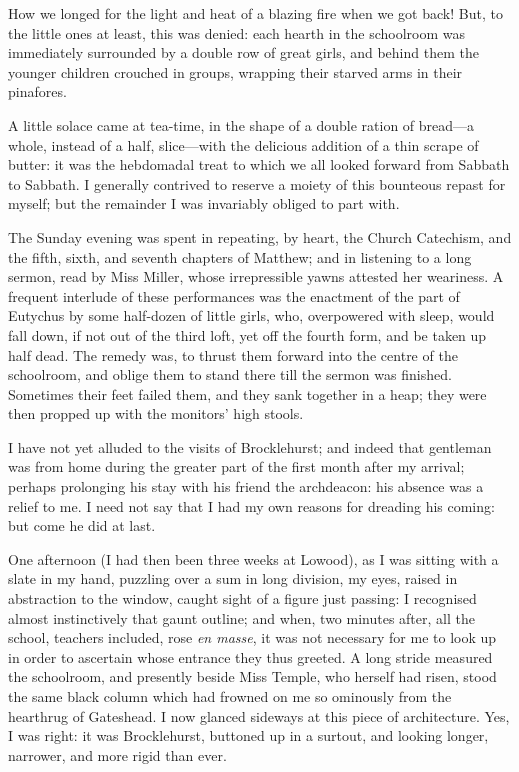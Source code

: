 How we longed for the light and heat of a blazing fire when we got
back! But, to the little ones at least, this was denied: each hearth in
the schoolroom was immediately surrounded by a double row of great
girls, and behind them the younger children crouched in groups, wrapping
their starved arms in their pinafores.

A little solace came at tea-time, in the shape of a double ration of
bread---a whole, instead of a half, slice---with the delicious addition
of a thin scrape of butter: it was the hebdomadal treat to which we all
looked forward from Sabbath to Sabbath. I generally contrived to
reserve a moiety of this bounteous repast for myself; but the remainder
I was invariably obliged to part with.

The Sunday evening was spent in repeating, by heart, the Church
Catechism, and the fifth, sixth, and seventh chapters of \St{} Matthew;
and in listening to a long sermon, read by Miss Miller, whose
irrepressible yawns attested her weariness. A frequent interlude of
these performances was the enactment of the part of Eutychus by some
half-dozen of little girls, who, overpowered with sleep, would fall
down, if not out of the third loft, yet off the fourth form, and be
taken up half dead. The remedy was, to thrust them forward into the
centre of the schoolroom, and oblige them to stand there till the sermon
was finished. Sometimes their feet failed them, and they sank together
in a heap; they were then propped up with the monitors' high stools.

I have not yet alluded to the visits of \Mr{} Brocklehurst; and indeed
that gentleman was from home during the greater part of the first month
after my arrival; perhaps prolonging his stay with his friend the
archdeacon: his absence was a relief to me. I need not say that I had
my own reasons for dreading his coming: but come he did at last.

One afternoon (I had then been three weeks at Lowood), as I was sitting
with a slate in my hand, puzzling over a sum in long division, my eyes,
raised in abstraction to the window, caught sight of a figure just
passing: I recognised almost instinctively that gaunt outline; and when,
two minutes after, all the school, teachers included, rose \emph{en
	masse}, it was not necessary for me to look up in order to ascertain
whose entrance they thus greeted. A long stride measured the
schoolroom, and presently beside Miss Temple, who herself had risen,
stood the same black column which had frowned on me so ominously from
the hearthrug of Gateshead. I now glanced sideways at this piece of
architecture. Yes, I was right: it was \Mr{} Brocklehurst, buttoned up in
a surtout, and looking longer, narrower, and more rigid than ever.


